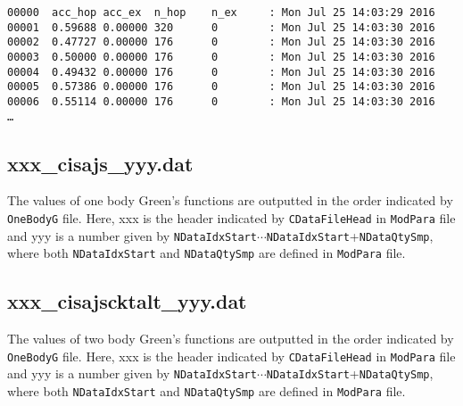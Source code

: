 \begin{minipage}{15.5cm}
\begin{screen}
\begin{verbatim}
00000  acc_hop acc_ex  n_hop    n_ex     : Mon Jul 25 14:03:29 2016
00001  0.59688 0.00000 320      0        : Mon Jul 25 14:03:30 2016
00002  0.47727 0.00000 176      0        : Mon Jul 25 14:03:30 2016
00003  0.50000 0.00000 176      0        : Mon Jul 25 14:03:30 2016
00004  0.49432 0.00000 176      0        : Mon Jul 25 14:03:30 2016
00005  0.57386 0.00000 176      0        : Mon Jul 25 14:03:30 2016
00006  0.55114 0.00000 176      0        : Mon Jul 25 14:03:30 2016    
…
\end{verbatim}
\end{screen}
\end{minipage}

\subsection{xxx\_cisajs\_yyy.dat }
The values of one body Green's functions are outputted in the order indicated by \verb|OneBodyG| file.
Here, xxx is the header indicated by \verb|CDataFileHead| in \verb|ModPara| file and yyy is a number given by \verb|NDataIdxStart|$\cdots$\verb|NDataIdxStart|+\verb|NDataQtySmp|, where both \verb|NDataIdxStart| and \verb|NDataQtySmp| are defined in \verb|ModPara| file.

\subsection{xxx\_cisajscktalt\_yyy.dat }
The values of two body Green's functions are outputted in the order indicated by \verb|OneBodyG| file.
Here, xxx is the header indicated by \verb|CDataFileHead| in \verb|ModPara| file and yyy is a number given by \verb|NDataIdxStart|$\cdots$\verb|NDataIdxStart|+\verb|NDataQtySmp|, where both \verb|NDataIdxStart| and \verb|NDataQtySmp| are defined in \verb|ModPara| file.
